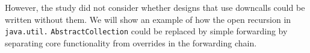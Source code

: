 \documentclass[preprint,10pt]{sigplanconf}
\begin{document}
However, the study did not consider whether designs that use
downcalls could be written without them.  We will show an example
of how the open recursion in \texttt{java.util.} \texttt{AbstractCollection}
could be replaced by simple forwarding by separating core
functionality from overrides in the forwarding chain.






\end{document}
